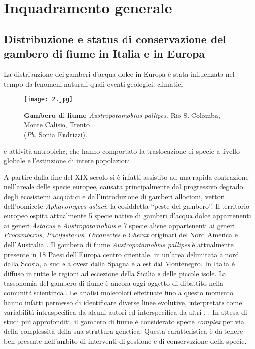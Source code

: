 \documentclass[10pt,twoside,openany,x11names,svgnames,italian,a5paper,dvipsnames,table]{memoir}
\newcommand\chapterillustration{}
\newcommand{\ph}{\emph{Ph}. }
\begin{document}
\normalsize
   
\setlength\afterchapskip{55mm}
\chapter{Inquadramento generale}
\renewcommand\chapterillustration{6.jpg}

\section{Distribuzione e status di conservazione del gambero di fiume in Italia e in Europa}
La distribuzione dei gamberi d’acqua dolce in Europa è stata influenzata nel tempo da fenomeni naturali quali eventi geologici, climatici  
\begin{wrapfigure}[15]{l}{.6\textwidth}
\vspace{-.3cm}
\texttt{[image: 2.jpg]}
\caption*{\textbf{Gambero di fiume} \emph{Austropotamobius pallipes}. Rio S. Colomba, Monte Calisio, Trento \\ (\ph Sonia Endrizzi).}
\end{wrapfigure}
e attività antropiche, che hanno comportato la traslocazione di specie a livello globale e l’estinzione di intere popolazioni. 

A partire dalla fine del XIX secolo si è infatti assistito ad una rapida contrazione nell’areale delle specie europee, causata principalmente dal progressivo degrado degli ecosistemi acquatici e dall’introduzione di gamberi alloctoni, vettori dell’oomicete \emph{Aphanomyces astaci}, la cosiddetta “peste del gambero”. Il territorio europeo ospita attualmente 5 specie native di gamberi d’acqua dolce appartenenti ai generi \emph{Astacus} e \emph{Austropotamobius} \cite{Souty} e 7 specie aliene appartenenti ai generi \emph{Procambarus}, \emph{Pacifastacus}, \emph{Orconectes} e \emph{Cherax} originari del Nord America e dell’Australia \cite{DAISIE}. 
Il gambero di fiume \href{http://217.199.4.93/webgis/?specie=Austropotamobius%20pallipes}{\emph{Austropotamobius pallipes}} è attualmente presente in 18 Paesi dell’Europa centro orientale, in un’area delimitata a nord dalla Scozia, a sud e a ovest dalla Spagna e a est dal Montenegro. In Italia è diffuso in tutte le regioni ad eccezione della Sicilia e delle piccole isole. La tassonomia del gambero di fiume è ancora oggi oggetto di dibattito nella comunità scientifica \cite{Souty}. Le analisi molecolari effettuate fino a questo momento hanno infatti permesso di identificare diverse linee evolutive, interpretate come variabilità intraspecifica da alcuni autori \cite{Chiesa} ed interspecifica da altri \cite{Fratini}, \cite{Zaccara}. In attesa di studi più approfonditi, il gambero di fiume è considerato specie \emph{complex} per via della complessità della sua struttura genetica. Questa caratteristica è da tenere ben presente nell’ambito di interventi di gestione e di conservazione della specie.
\end{document}

